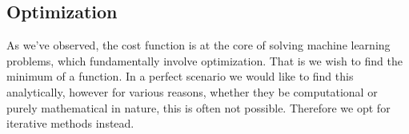 \documentclass{article}
\theoremstyle{definition}
\DeclareMathOperator*{\argmin}{arg\,min}
\begin{document}

\subsection{Optimization}

As we've observed, the cost function is at the core of solving machine learning problems, which fundamentally involve optimization. That is we wish to find the minimum of a function. In a perfect scenario we would like to find this analytically, however for various reasons, whether they be computational or purely mathematical in nature, this is often not possible. Therefore we opt for iterative methods instead.
\end{document}
